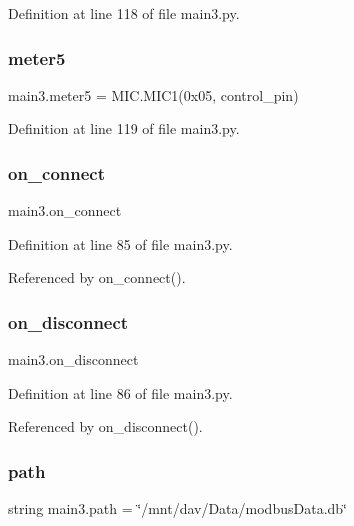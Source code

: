 Definition at line 118 of file main3.\+py.

\mbox{\label{namespacemain3_aeda58cee300f9fae14d6fc3ca9891847}} 
\subsubsection{\texorpdfstring{meter5}{meter5}}
{\footnotesize\ttfamily main3.\+meter5 = M\+I\+C.\+M\+I\+C1(0x05, control\+\_\+pin)}



Definition at line 119 of file main3.\+py.

\mbox{\label{namespacemain3_a750e986d76cf0b4ce563501efc1d8f74}} 
\subsubsection{\texorpdfstring{on\+\_\+connect}{on\_connect}}
{\footnotesize\ttfamily main3.\+on\+\_\+connect}



Definition at line 85 of file main3.\+py.



Referenced by on\+\_\+connect().

\mbox{\label{namespacemain3_afecee61e71845eda2bab29e6c6d4f91c}} 
\subsubsection{\texorpdfstring{on\+\_\+disconnect}{on\_disconnect}}
{\footnotesize\ttfamily main3.\+on\+\_\+disconnect}



Definition at line 86 of file main3.\+py.



Referenced by on\+\_\+disconnect().

\mbox{\label{namespacemain3_a94593883ff80bece1776244df08104a1}} 
\subsubsection{\texorpdfstring{path}{path}}
{\footnotesize\ttfamily string main3.\+path = \char`\"{}/mnt/dav/Data/modbus\+Data.\+db\char`\"{}}



